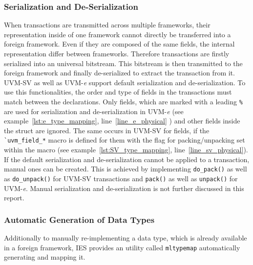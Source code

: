 \subsubsection{Serialization and De-Serialization}
When transactions are transmitted across multiple frameworks, their representation inside of one framework cannot
directly be transferred into a foreign framework. Even if they are composed of the same fields, the internal
representation differ between frameworks. Therefore transactions are firstly serialized into an universal bitstream.
This bitstream is then transmitted to the foreign framework and finally de-serialized to extract the transaction from
it.\\
UVM-SV as well as UVM-\textit{e} support default serialization and de-serialization. To use this
functionalities,  the order and type of fields in the transactions must match between the declarations. Only fields,
which are marked with a leading \lstinline$%$ are used for serialization and de-serialization in UVM-\textit{e} (see
example~\ref{lst:e_type_mapping}, line~\ref{line_e_physical} ) and other fields inside the struct are ignored. The same
occurs in UVM-SV for fields, if the \lstinline$`uvm_field_*$ macro is defined for them with the flag for
packing/unpacking set within the macro (see example~\ref{lst:SV_type_mapping}, line~\ref{line_sv_physical}).\\
If the default serialization and de-serialization cannot be applied to a transaction, manual ones can be created. This is achieved by
implementing \lstinline$do_pack()$ as well as \lstinline$do_unpack()$ for UVM-SV transactions and
\lstinline$pack()$ as well as \lstinline$unpack()$ for UVM-\textit{e}. Manual serialization and de-serialization is not further discussed in this report. 

\subsubsection{Automatic Generation of Data Types}
Additionally to manually re-implementing a data type, which is already available in a foreign framework, IES provides an utility called \lstinline$mltypemap$ automatically generating and mapping it.
